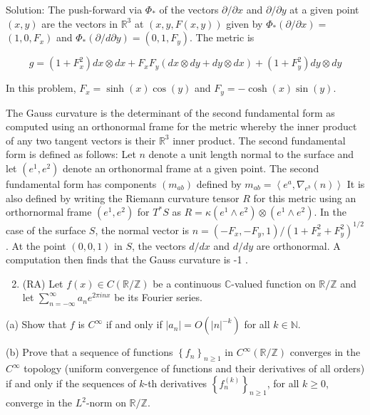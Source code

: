 \documentclass[10pt]{article}
\begin{document}
Solution: The push-forward via $\Phi_{*}$ of the vectors $\partial / \partial x$ and $\partial / \partial y$ at a given point $(x, y)$ are the vectors in $\mathbb{R}^{3}$ at $(x, y, F(x, y))$ given by $\Phi_{*}(\partial / \partial x)=$ $\left(1,0, F_{x}\right)$ and $\Phi_{*}(\partial / d \partial y)=\left(0,1, F_{y}\right)$. The metric is

$$
g=\left(1+F_{x}^{2}\right) d x \otimes d x+F_{x} F_{y}(d x \otimes d y+d y \otimes d x)+\left(1+F_{y}^{2}\right) d y \otimes d y
$$

In this problem, $F_{x}=\sinh (x) \cos (y)$ and $F_{y}=-\cosh (x) \sin (y)$.

The Gauss curvature is the determinant of the second fundamental form as computed using an orthonormal frame for the metric whereby the inner product of any two tangent vectors is their $\mathbb{R}^{3}$ inner product. The second fundamental form is defined as follows: Let $n$ denote a unit length normal to the surface and let $\left(e^{1}, e^{2}\right)$ denote an orthonormal frame at a given point. The second fundamental form has components $\left(m_{a b}\right)$ defined by $m_{a b}=\left\langle e^{a}, \nabla_{e^{b}}(n)\right\rangle$ It is also defined by writing the Riemann curvature tensor $R$ for this metric using an orthornormal frame $\left(e^{1}, e^{2}\right)$ for $T^{*} S$ as $R=\kappa\left(e^{1} \wedge e^{2}\right) \otimes\left(e^{1} \wedge e^{2}\right)$. In the case of the surface $S$, the normal vector is $n=\left(-F_{x},-F_{y}, 1\right) /\left(1+F_{x}^{2}+F_{y}^{2}\right)^{1 / 2}$. At the point $(0,0,1)$ in $S$, the vectors $d / d x$ and $d / d y$ are orthonormal. A computation then finds that the Gauss curvature is -1 .

\begin{enumerate}
  \setcounter{enumi}{1}
  \item (RA) Let $f(x) \in C(\mathbb{R} / \mathbb{Z})$ be a continuous $\mathbb{C}$-valued function on $\mathbb{R} / \mathbb{Z}$ and let $\sum_{n=-\infty}^{\infty} a_{n} e^{2 \pi i n x}$ be its Fourier series.
\end{enumerate}

(a) Show that $f$ is $C^{\infty}$ if and only if $\left|a_{n}\right|=O\left(|n|^{-k}\right)$ for all $k \in \mathbb{N}$.

(b) Prove that a sequence of functions $\left\{f_{n}\right\}_{n \geq 1}$ in $C^{\infty}(\mathbb{R} / \mathbb{Z})$ converges in the $C^{\infty}$ topology (uniform convergence of functions and their derivatives of all orders) if and only if the sequences of $k$-th derivatives $\left\{f_{n}^{(k)}\right\}_{n \geq 1}$, for all $k \geq 0$, converge in the $L^{2}$-norm on $\mathbb{R} / \mathbb{Z}$.
\end{document}
